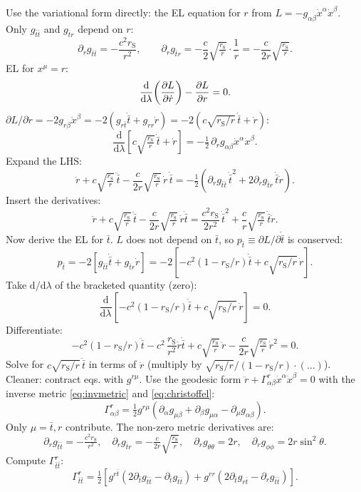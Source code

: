 \documentclass[11pt]{article}
\newcommand{\de}{\mathrm{d}}
\newcommand{\rs}{r_{\mathrm{S}}}
\begin{document}
Use the variational form directly: the EL equation for $r$ from $L=-g_{\alpha\beta}\dot x^\alpha\dot x^\beta$. Only $g_{\bar t\bar t}$ and $g_{\bar t r}$ depend on $r$:
\[
\partial_r g_{\bar t\bar t} = -\frac{c^2\rs}{r^2},\qquad \partial_r g_{\bar t r} = -\frac{c}{2}\sqrt{\tfrac{\rs}{r}}\cdot\frac{1}{r}= -\frac{c}{2r}\sqrt{\tfrac{\rs}{r}}.
\]
EL for $x^\mu=r$:
\[
\frac{\de}{\de\lambda}\!\left(\pdv{L}{\dot r}\right) - \pdv{L}{r} = 0.
\]
$\partial L/\partial\dot r = -2 g_{r\beta}\dot x^\beta = -2(g_{r\bar t}\dot{\bar t}+g_{rr}\dot r) = -2(c\sqrt{\rs/r}\,\dot{\bar t}+\dot r)$:
\[
\frac{\de}{\de\lambda}\!\left[c\sqrt{\tfrac{\rs}{r}}\,\dot{\bar t}+\dot r\right]
= -\tfrac12\,\partial_r g_{\alpha\beta}\dot x^\alpha\dot x^\beta.
\]
Expand the LHS:
\[
\ddot r + c\sqrt{\tfrac{\rs}{r}}\,\ddot{\bar t} - \frac{c}{2r}\sqrt{\tfrac{\rs}{r}}\,\dot r\,\dot{\bar t}
= -\tfrac12\!\left(\partial_r g_{\bar t\bar t}\,\dot{\bar t}^2 + 2\partial_r g_{\bar t r}\,\dot{\bar t}\dot r\right).
\]
Insert the derivatives:
\[
\ddot r + c\sqrt{\tfrac{\rs}{r}}\,\ddot{\bar t} - \frac{c}{2r}\sqrt{\tfrac{\rs}{r}}\,\dot r\dot{\bar t}
= \frac{c^2\rs}{2r^2}\,\dot{\bar t}^2 + \frac{c}{r}\sqrt{\tfrac{\rs}{r}}\,\dot{\bar t}\dot r.
\]
Now derive the EL for $\bar t$. $L$ does not depend on $\bar t$, so $p_{\bar t}\equiv\partial L/\partial\dot{\bar t}$ is conserved:
\[
p_{\bar t} = -2\!\left[g_{\bar t\bar t}\dot{\bar t}+g_{\bar t r}\dot r\right] = -2\!\left[-c^2(1-\rs/r)\dot{\bar t}+c\sqrt{\rs/r}\,\dot r\right].
\]
Take $\de/\de\lambda$ of the bracketed quantity (zero):
\[
\frac{\de}{\de\lambda}\!\left[-c^2(1-\rs/r)\dot{\bar t}+c\sqrt{\rs/r}\,\dot r\right] = 0.
\]
Differentiate:
\[
-c^2(1-\rs/r)\ddot{\bar t} - c^2\,\frac{\rs}{r^2}\dot r\dot{\bar t} + c\sqrt{\tfrac{\rs}{r}}\,\ddot r - \frac{c}{2r}\sqrt{\tfrac{\rs}{r}}\,\dot r^2 = 0.
\]
Solve for $c\sqrt{\rs/r}\,\ddot{\bar t}$ in terms of $\ddot r$ (multiply by $\sqrt{\rs/r}/(1-\rs/r)\cdot(\dots)$). Cleaner: contract eqs. with $g^{r\mu}$. Use the geodesic form $\ddot r+\Gamma^r_{\alpha\beta}\dot x^\alpha\dot x^\beta=0$ with the inverse metric \eqref{eq:invmetric} and \eqref{eq:christoffel}:
\[
\Gamma^r_{\alpha\beta} = \tfrac12 g^{r\mu}(\partial_\alpha g_{\mu\beta}+\partial_\beta g_{\mu\alpha}-\partial_\mu g_{\alpha\beta}).
\]
Only $\mu=\bar t,r$ contribute. The non-zero metric derivatives are:
\[
\partial_r g_{\bar t\bar t} = -\tfrac{c^2\rs}{r^2},\quad \partial_r g_{\bar t r} = -\tfrac{c}{2r}\sqrt{\tfrac{\rs}{r}},\quad \partial_r g_{\theta\theta}=2r,\quad \partial_r g_{\phi\phi}=2r\sin^2\theta.
\]
Compute $\Gamma^r_{\bar t\bar t}$:
\[
\Gamma^r_{\bar t\bar t} = \tfrac12\!\left[g^{r\bar t}(2\partial_{\bar t}g_{\bar t\bar t}-\partial_{\bar t}g_{\bar t\bar t}) + g^{rr}(2\partial_{\bar t}g_{r\bar t}-\partial_r g_{\bar t\bar t})\right].
\]
\end{document}
